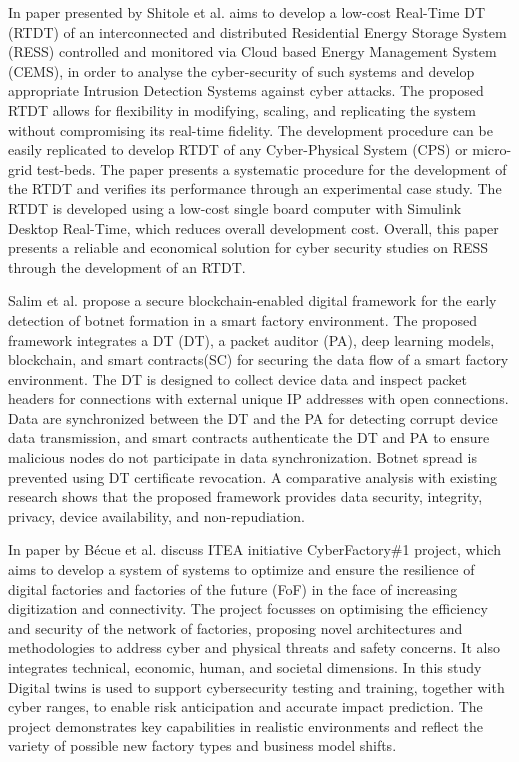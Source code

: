  In\cite{shitoleRealTimeDigitalTwin2021} paper presented by Shitole et al. aims to develop a low-cost Real-Time DT (RTDT) of an interconnected and distributed Residential Energy Storage System (RESS) controlled and monitored via Cloud based Energy Management System (CEMS), in order to analyse the cyber-security of such systems and develop appropriate Intrusion Detection Systems against cyber attacks. The proposed RTDT allows for flexibility in modifying, scaling, and replicating the system without compromising its real-time fidelity. The development procedure can be easily replicated to develop RTDT of any Cyber-Physical System (CPS) or micro-grid test-beds. The paper presents a systematic procedure for the development of the RTDT and verifies its performance through an experimental case study. The RTDT is developed using a low-cost single board computer with Simulink Desktop Real-Time, which reduces overall development cost. Overall, this paper presents a reliable and economical solution for cyber security studies on RESS through the development of an RTDT.


 Salim et al.\cite{salimBlockchainEnabledSecureDigital2022} propose a secure blockchain-enabled digital framework for the early detection of botnet formation in a smart factory environment. The proposed framework integrates a DT (DT), a packet auditor (PA), deep learning models, blockchain, and smart contracts(SC) for securing the data flow of a smart factory environment. The DT is designed to collect device data and inspect packet headers for connections with external unique IP addresses with open connections. Data are synchronized between the DT and the PA for detecting corrupt device data transmission, and smart contracts authenticate the DT and PA to ensure malicious nodes do not participate in data synchronization. Botnet spread is prevented using DT certificate revocation. A comparative analysis with existing research shows that the proposed framework provides data security, integrity, privacy, device availability, and non-repudiation.


In\cite{becueCyberFactorySecuringIndustry40with2018} paper by Bécue et al. discuss ITEA initiative CyberFactory\#1 project, which aims to develop a system of systems to optimize and ensure the resilience of digital factories and factories of the future (FoF) in the face of increasing digitization and connectivity. The project focusses on optimising the efficiency and security of the network of factories, proposing novel architectures and methodologies to address cyber and physical threats and safety concerns. It also integrates technical, economic, human, and societal dimensions. In this study Digital twins is used to support cybersecurity testing and training, together with cyber ranges, to enable risk anticipation and accurate impact prediction. The project demonstrates key capabilities in realistic environments and reflect the variety of possible new factory types and business model shifts.



